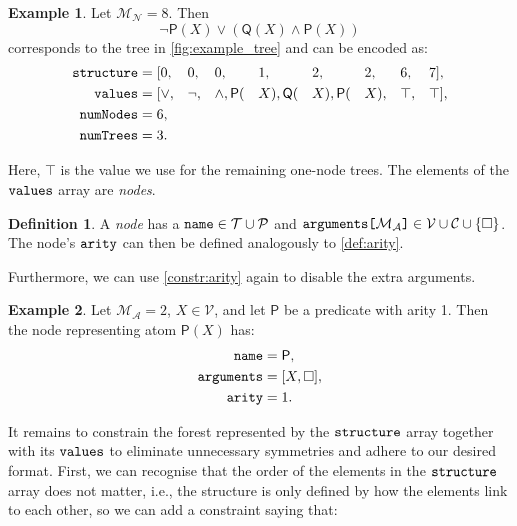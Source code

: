 \documentclass[letterpaper]{article}
\theoremstyle{definition}
\newtheorem{definition}{Definition}
\newtheorem{example}{Example}
\newcommand{\variable}[1]{\texttt{\textup{#1}}}
\newcommand{\arrayd}[3]{\variable{{#1}[}{#2}\variable{]} \in {#3}}
\newcommand{\predicates}{\mathcal{P}}
\newcommand{\variables}{\mathcal{V}}
\newcommand{\constants}{\mathcal{C}}
\newcommand{\tokens}{\mathcal{T}}
\newcommand{\maxArity}{\mathcal{M}_{\mathcal{A}}}
\newcommand{\maxNumNodes}{\mathcal{M}_{\mathcal{N}}}
\begin{document}
\begin{example} \label{example:formula}
  Let $\maxNumNodes{} = 8$. Then
  \[
    \neg\mathsf{P}(X) \lor (\mathsf{Q}(X) \land \mathsf{P}(X))
  \]
  corresponds to the tree in \cref{fig:example_tree} and can be encoded as:
  \begin{alignat*}{8}
    \variable{structure} &= [0, &&0, &&0, &&1, &&2, &&2, &&6, &&7],\\
    \variable{values} &= [{\lor}, &&{\neg}, &&{\land}, \mathsf{P}(&&X), \mathsf{Q}(&&X), \mathsf{P}(&&X), &&\top, &&\top],\\
    \variable{numNodes} &= 6, && && && && && && &&\\
    \variable{numTrees} &= 3. && && && && && && &&
  \end{alignat*}
\end{example}

Here, $\top$ is the value we use for the remaining one-node trees. The
elements of the $\variable{values}$ array are \emph{nodes}.

\begin{definition} \label{def:node}
  A \emph{node} has a $\variable{name} \in \tokens{} \cup \predicates{}$ and
  $\arrayd{arguments}{\maxArity{}}{\variables{} \cup \constants{} \cup \{ \Box
    \}}$. The node's $\variable{arity}$ can then be
  defined analogously to \cref{def:arity}.
\end{definition}

Furthermore, we can use \cref{constr:arity} again to disable the extra
arguments.

\begin{example}
  Let $\maxArity{} = 2$, $X \in \variables{}$, and let $\mathsf{P}$ be a
  predicate with arity 1. Then the node representing atom $\mathsf{P}(X)$ has:
  \begin{align*}
    \variable{name} &= \mathsf{P},\\
    \variable{arguments} &= [X, \Box],\\
    \variable{arity} &= 1.
  \end{align*}
\end{example}

It remains to constrain the forest represented by the $\variable{structure}$
array together with its $\variable{values}$ to eliminate unnecessary symmetries
and adhere to our desired format. First, we can recognise that the order of the
elements in the $\variable{structure}$ array does not matter, i.e., the
structure is only defined by how the elements link to each other, so we can add
a constraint saying that:
\end{document}
